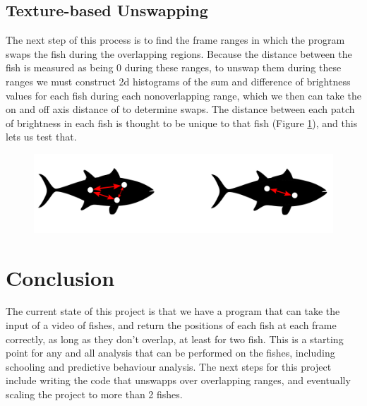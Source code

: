 \documentclass[12pt]{article}
\begin{document}
\subsection{Texture-based Unswapping}
The next step of this process is to find the frame ranges in which the program swaps the fish during the overlapping regions. Because the distance between the fish is measured as being 0 during these ranges, to unswap them during these ranges we must construct 2d histograms of the sum and difference of brightness values for each fish during each nonoverlapping range, which we then can take the on and off axis distance of to determine swaps. The distance between each patch of brightness in each fish is thought to be unique to that fish (Figure \ref{fig:bright_sketch}), and this lets us test that.
\begin{figure}[h] 
	\centering
	\includegraphics[width=.5\textwidth]{fish4}
	\caption{}
	\label{fig:bright_sketch}
\end{figure}

\section{Conclusion}

The current state of this project is that we have a program that can take the input of a video of fishes, and return the positions of each fish at each frame correctly, as long as they don't overlap, at least for two fish. This is a starting point for any and all analysis that can be performed on the fishes, including schooling and predictive behaviour analysis. The next steps for this project include writing the code that unswapps over overlapping ranges, and eventually scaling the project to more than 2 fishes.
\end{document}

